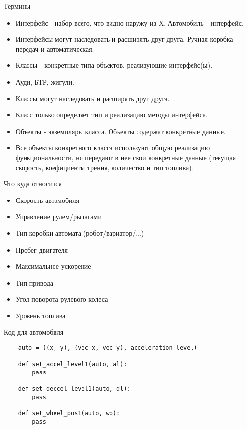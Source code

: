 \documentclass{article}
\begin{document}
\LARGE

\begin{center} Термины \end{center}
\begin{itemize}
    \item Интерфейс - набор всего, что видно наружу из X. Автомобиль - интерфейс.
    \item Интерфейсы могут наследовать и расширять друг друга. Ручная коробка передач и автоматическая.
    \item Классы - конкретные типа объектов, реализующие интерфейс(ы).
    \item Ауди, БТР, жигули. 
    \item Классы могут наследовать и расширять друг друга.
    \item Класс только определяет тип и реализацию методы интерфейса.
    \item Объекты - экземпляры класса. Объекты содержат конкретные данные.
    \item Все объекты конкретного класса используют общую реализацию функциональности, 
           но передают в нее свои конкретные данные (текущая скорость, коефициенты трения, 
           количество и тип топлива).
\end{itemize}
\newpage

\begin{center} Что куда относится \end{center}
\begin{itemize}
    \item Скорость автомобиля
    \item Управление рулем/рычагами
    \item Тип коробки-автомата (робот/вариатор/...)
    \item Пробег двигателя
    \item Максимальное ускорение
    \item Тип привода
    \item Угол поворота рулевого колеса
    \item Уровень топлива
\end{itemize}
\newpage


\begin{center} Код для автомобиля \end{center}
\begin{lstlisting}
    auto = ((x, y), (vec_x, vec_y), acceleration_level)

    def set_accel_level1(auto, al):
        pass

    def set_deccel_level1(auto, dl):
        pass

    def set_wheel_pos1(auto, wp):
        pass
\end{lstlisting}
\newpage
\end{document}
